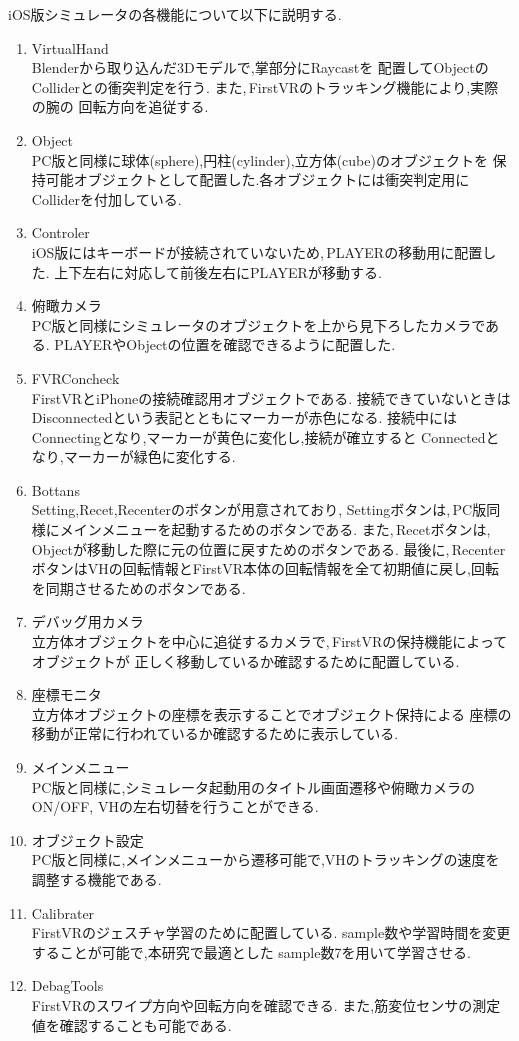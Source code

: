 \documentclass{ltjsreport}
\begin{document}
		iOS版シミュレータの各機能について以下に説明する.
		\begin{enumerate}
			\item VirtualHand\\
				Blenderから取り込んだ3Dモデルで,掌部分にRaycastを
				配置してObjectのColliderとの衝突判定を行う.
				また,\,FirstVRのトラッキング機能により,実際の腕の
				回転方向を追従する.
			\item Object\\
				PC版と同様に球体(sphere),円柱(cylinder),立方体(cube)のオブジェクトを
				保持可能オブジェクトとして配置した.各オブジェクトには衝突判定用にColliderを付加している.
			\item Controler\\
				iOS版にはキーボードが接続されていないため,\,PLAYERの移動用に配置した.
				上下左右に対応して前後左右にPLAYERが移動する.
			\item 俯瞰カメラ\\
				PC版と同様にシミュレータのオブジェクトを上から見下ろしたカメラである.
				PLAYERやObjectの位置を確認できるように配置した.
			\item FVRConcheck\\
				FirstVRとiPhoneの接続確認用オブジェクトである.
				接続できていないときはDisconnectedという表記とともにマーカーが赤色になる.
				接続中にはConnectingとなり,マーカーが黄色に変化し,接続が確立すると
				Connectedとなり,マーカーが緑色に変化する.
			\item Bottans\\
				Setting,Recet,Recenterのボタンが用意されており,
				Settingボタンは,\,PC版同様にメインメニューを起動するためのボタンである.
				また,\,Recetボタンは,\,Objectが移動した際に元の位置に戻すためのボタンである.
				最後に,\,RecenterボタンはVHの回転情報とFirstVR本体の回転情報を全て初期値に戻し,回転を同期させるためのボタンである.
			\item デバッグ用カメラ\\
				立方体オブジェクトを中心に追従するカメラで,\,FirstVRの保持機能によってオブジェクトが
				正しく移動しているか確認するために配置している.
			\item 座標モニタ\\
				立方体オブジェクトの座標を表示することでオブジェクト保持による
				座標の移動が正常に行われているか確認するために表示している.
			\item メインメニュー\\
				PC版と同様に,シミュレータ起動用のタイトル画面遷移や俯瞰カメラのON/OFF,
				VHの左右切替を行うことができる.
			\item オブジェクト設定\\
				PC版と同様に,メインメニューから遷移可能で,VHのトラッキングの速度を調整する機能である.
			\item Calibrater\\
				FirstVRのジェスチャ学習のために配置している.
				sample数や学習時間を変更することが可能で,本研究で最適とした
				sample数7を用いて学習させる.
			\item DebagTools\\
				FirstVRのスワイプ方向や回転方向を確認できる.
				また,筋変位センサの測定値を確認することも可能である.
		\end{enumerate}
\end{document}
